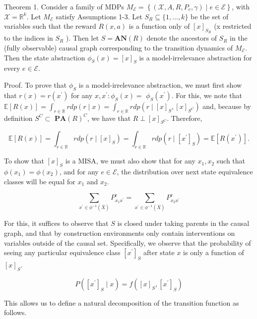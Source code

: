 \documentclass[10pt]{article}
\begin{document}
Theorem 1. Consider a family of MDPs $M_{\mathcal{E}}=\left\{\left(\mathcal{X}, A, R, P_{e}, \gamma\right) \mid e \in \mathcal{E}\right\}$, with $\mathcal{X}=\mathbb{R}^{k}$. Let $M_{\mathcal{E}}$ satisfy Assumptions 1-3. Let $S_{R} \subseteq\{1, \ldots, k\}$ be the set of variables such that the reward $R(x, a)$ is a function only of $[x]_{S_{R}}$ (x restricted to the indices in $S_{R}$ ). Then let $S=\boldsymbol{A N}(R)$ denote the ancestors of $S_{R}$ in the (fully observable) causal graph corresponding to the transition dynamics of $M_{\mathcal{E}}$. Then the state abstraction $\phi_{S}(x)=[x]_{S}$ is a model-irrelevance abstraction for every $e \in \mathcal{E}$.

Proof. To prove that $\phi_{S}$ is a model-irrelevance abstraction, we must first show that $r(x)=r\left(x^{\prime}\right)$ for any $x, x^{\prime}: \phi_{S}(x)=$ $\phi_{S}\left(x^{\prime}\right)$. For this, we note that $\mathbb{E}[R(x)]=\int_{r \in \mathbb{R}} r d p(r \mid x)=\int_{r \in \mathbb{R}} r d p\left(r \mid[x]_{S},[x]_{S^{C}}\right)$ and, because by definition $S^{C} \subset$ $\mathbf{P A}(R)^{C}$, we have that $R \perp[x]_{S^{C}}$. Therefore,

\[
\mathbb{E}[R(x)]=\int_{r \in \mathbb{R}} r d p\left(r \mid[x]_{S}\right)=\int_{r \in \mathbb{R}} r d p\left(r \mid\left[x^{\prime}\right]_{S}\right)=\mathbb{E}\left[R\left(x^{\prime}\right)\right] .
\]

To show that $[x]_{S}$ is a MISA, we must also show that for any $x_{1}, x_{2}$ such that $\phi\left(x_{1}\right)=\phi\left(x_{2}\right)$, and for any $e \in \mathcal{E}$, the distribution over next state equivalence classes will be equal for $x_{1}$ and $x_{2}$.

\[
\sum_{x^{\prime} \in \phi^{-1}(\bar{X})} P_{x_{1} x^{\prime}}^{e}=\sum_{x^{\prime} \in \phi^{-1}(\bar{X})} P_{x_{2} x^{\prime}}^{e}
\]

For this, it suffices to observe that $S$ is closed under taking parents in the causal graph, and that by construction environments only contain interventions on variables outside of the causal set. Specifically, we observe that the probability of seeing any particular equivalence class $\left[x^{\prime}\right]_{S}$ after state $x$ is only a function of $[x]_{S}$.

\[
P\left(\left[x^{\prime}\right]_{S} \mid x\right)=f\left([x]_{S},\left[x^{\prime}\right]_{S}\right)
\]

This allows us to define a natural decomposition of the transition function as follows.
\end{document}
